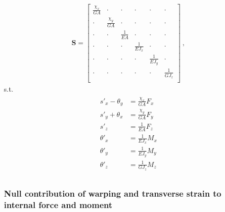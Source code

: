 \documentclass[letterpaper,10pt,english]{jupyterBook}
\begin{document}
\begin{equation*}
\begin{split}\mathbf{S} = \begin{bmatrix}
 \frac{\chi_x}{GA} & \cdot             & \cdot         & \cdot          & \cdot          & \cdot          \\
 \cdot             & \frac{\chi_y}{GA} & \cdot         & \cdot          & \cdot          & \cdot          \\
 \cdot             & \cdot             & \frac{1}{EA}  & \cdot          & \cdot          & \cdot          \\
 \cdot             & \cdot             & \cdot         & \frac{1}{EJ_x} & \cdot          & \cdot          \\
 \cdot             & \cdot             & \cdot         & \cdot          & \frac{1}{EJ_y} & \cdot          \\
 \cdot             & \cdot             & \cdot         & \cdot          & \cdot          & \frac{1}{GJ_z} \\
\end{bmatrix} \ ,\end{split}
\end{equation*}
\sphinxAtStartPar
s.t.
\begin{equation*}
\begin{split}\begin{aligned}
  s'_x - \theta_y & = \frac{\chi_x}{GA  } F_x  \\
  s'_y + \theta_x & = \frac{\chi_y}{GA  } F_y  \\
  s'_z            & = \frac{1     }{EA  } F_z  \\
  \theta'_x       & = \frac{1     }{EJ_x} M_x  \\
  \theta'_y       & = \frac{1     }{EJ_y} M_y  \\
  \theta'_z       & = \frac{1     }{GJ_z} M_z  \\
\end{aligned}\end{split}
\end{equation*}\subsubsection*{Null contribution of warping and transverse strain to internal force and moment}
\end{document}
